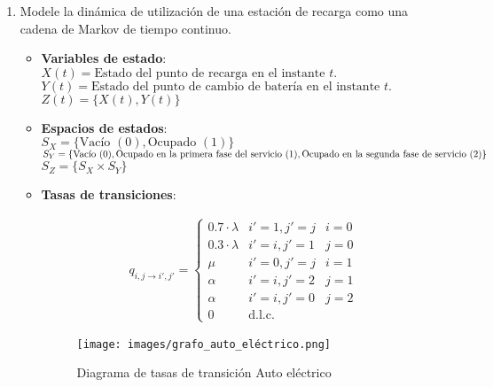 \begin{enumerate}
\item  Modele la dinámica de utilización de una estación de recarga como una cadena de Markov de tiempo continuo. \

    \begin{itemize}
    	\item[] \textbf{Variables de estado}:\\
             $X(t) = \text{Estado del punto de recarga en el instante } t.$\\
             $Y(t) = \text{Estado del punto de cambio de batería en el instante } t.$\\
             $Z(t) = \{X(t), Y(t)\}$
                    
    
    	\item[] \textbf{Espacios de estados}:\\
            $S_X = \{\text{Vacío } (0), \text{Ocupado }(1)\}$\\
            $S_Y = \{\text{Vacío } (0), \text{Ocupado en la primera fase del servicio }(1),\\ \text{Ocupado en la segunda fase de servicio }(2)\}$\\
            $S_Z = \{S_X \times S_Y\}$ 

    	\item[] \textbf{Tasas de transiciones}:

            \begin{align*}
             q_{{i,j} \to {i',j'}} = \left\{ 
                \begin{array}{llll}
                    0.7 \cdot \lambda    &  i'=1, j'=j & i=0 \\ 
                    0.3 \cdot \lambda    &  i'=i, j'=1 & j=0 \\ 
                    \mu    &  i'=0, j'=j & i=1 \\ 
                    \alpha    &  i'=i, j'=2 & j=1 \\
                    \alpha    &  i'=i, j'=0 & j=2 \\
                    0 & \text{d.l.c.}
                \end{array} \right.
            \end{align*}
            
            \begin{figure}
                \centering
                \texttt{[image: images/grafo\_auto\_eléctrico.png]}
                \caption{Diagrama de tasas de transición Auto eléctrico}
                \label{fig:my_label}
            \end{figure}


    
    \end{itemize}



\end{enumerate}
